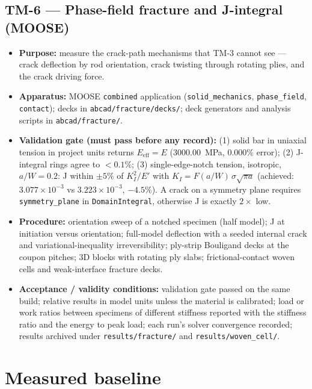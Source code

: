 \documentclass[11pt]{article}
\begin{document}
\subsection*{TM-6 --- Phase-field fracture and J-integral (MOOSE)}
\begin{itemize}[nosep]
  \item \textbf{Purpose:} measure the crack-path mechanisms that TM-3 cannot see --- crack deflection
    by rod orientation, crack twisting through rotating plies, and the crack driving force.
  \item \textbf{Apparatus:} MOOSE \texttt{combined} application (\texttt{solid\_mechanics},
    \texttt{phase\_field}, \texttt{contact}); decks in \texttt{abcad/fracture/decks/}; deck generators and
    analysis scripts in \texttt{abcad/fracture/}.
  \item \textbf{Validation gate (must pass before any record):} (1) solid bar in uniaxial tension in
    project units returns $E_\mathrm{eff} = E$ ($3000.00$~MPa, 0.000\% error); (2) J-integral rings
    agree to $<0.1\%$; (3) single-edge-notch tension, isotropic, $a/W = 0.2$: J within $\pm 5\%$ of
    $K_I^2/E'$ with $K_I = F(a/W)\,\sigma\sqrt{\pi a}$ (achieved: $3.077\times10^{-3}$ vs
    $3.223\times10^{-3}$, $-4.5\%$). A crack on a symmetry plane requires
    \texttt{symmetry\_plane} in \texttt{DomainIntegral}, otherwise J is exactly $2\times$ low.
  \item \textbf{Procedure:} orientation sweep of a notched specimen (half model); J at initiation
    versus orientation; full-model deflection with a seeded internal crack and variational-inequality
    irreversibility; ply-strip Bouligand decks at the coupon pitches; 3D blocks with rotating ply
    slabs; frictional-contact woven cells and weak-interface fracture decks.
  \item \textbf{Acceptance / validity conditions:} validation gate passed on the same build; relative
    results in model units unless the material is calibrated; load or work ratios between specimens of
    different stiffness reported with the stiffness ratio and the energy to peak load; each run's solver
    convergence recorded; results archived under \texttt{results/fracture/} and
    \texttt{results/woven\_cell/}.
\end{itemize}

\section{Measured baseline}
\end{document}
